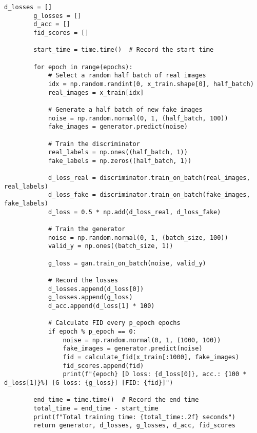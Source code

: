 \begin{lstlisting}[style=mypython, caption=Explore GAN with more convolutional layers 4]
        d_losses = []
        g_losses = []
        d_acc = []
        fid_scores = []
        
        start_time = time.time()  # Record the start time
    
        for epoch in range(epochs):
            # Select a random half batch of real images
            idx = np.random.randint(0, x_train.shape[0], half_batch)
            real_images = x_train[idx]
    
            # Generate a half batch of new fake images
            noise = np.random.normal(0, 1, (half_batch, 100))
            fake_images = generator.predict(noise)
    
            # Train the discriminator
            real_labels = np.ones((half_batch, 1))
            fake_labels = np.zeros((half_batch, 1))
    
            d_loss_real = discriminator.train_on_batch(real_images, real_labels)
            d_loss_fake = discriminator.train_on_batch(fake_images, fake_labels)
            d_loss = 0.5 * np.add(d_loss_real, d_loss_fake)
    
            # Train the generator
            noise = np.random.normal(0, 1, (batch_size, 100))
            valid_y = np.ones((batch_size, 1))
    
            g_loss = gan.train_on_batch(noise, valid_y)
    
            # Record the losses
            d_losses.append(d_loss[0])
            g_losses.append(g_loss)
            d_acc.append(d_loss[1] * 100)
            
            # Calculate FID every p_epoch epochs
            if epoch % p_epoch == 0:
                noise = np.random.normal(0, 1, (1000, 100))
                fake_images = generator.predict(noise)
                fid = calculate_fid(x_train[:1000], fake_images)
                fid_scores.append(fid)
                print(f"{epoch} [D loss: {d_loss[0]}, acc.: {100 * d_loss[1]}%] [G loss: {g_loss}] [FID: {fid}]")
    
        end_time = time.time()  # Record the end time
        total_time = end_time - start_time
        print(f"Total training time: {total_time:.2f} seconds")
        return generator, d_losses, g_losses, d_acc, fid_scores
\end{lstlisting}

